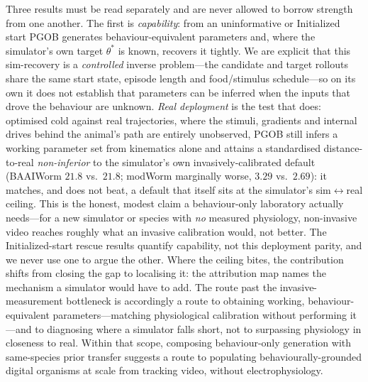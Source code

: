\documentclass[11pt]{article}
\begin{document}
Three results must be read separately and are never allowed to borrow strength from one another. The first is \emph{capability}: from an uninformative or Initialized start PGOB generates behaviour-equivalent parameters and, where the simulator's own target $\theta^{*}$ is known, recovers it tightly. We are explicit that this sim-recovery is a \emph{controlled} inverse problem---the candidate and target rollouts share the same start state, episode length and food/stimulus schedule---so on its own it does not establish that parameters can be inferred when the inputs that drove the behaviour are unknown. \emph{Real deployment} is the test that does: optimised cold against real trajectories, where the stimuli, gradients and internal drives behind the animal's path are entirely unobserved, PGOB still infers a working parameter set from kinematics alone and attains a standardised distance-to-real \emph{non-inferior} to the simulator's own invasively-calibrated default (BAAIWorm $21.8$ vs.\ $21.8$; modWorm marginally worse, $3.29$ vs.\ $2.69$): it matches, and does not beat, a default that itself sits at the simulator's sim$\leftrightarrow$real ceiling. This is the honest, modest claim a behaviour-only laboratory actually needs---for a new simulator or species with \emph{no} measured physiology, non-invasive video reaches roughly what an invasive calibration would, not better. The Initialized-start rescue results quantify capability, not this deployment parity, and we never use one to argue the other. Where the ceiling bites, the contribution shifts from closing the gap to localising it: the attribution map names the mechanism a simulator would have to add. The route past the invasive-measurement bottleneck is accordingly a route to obtaining working, behaviour-equivalent parameters---matching physiological calibration without performing it---and to diagnosing where a simulator falls short, not to surpassing physiology in closeness to real. Within that scope, composing behaviour-only generation with same-species prior transfer suggests a route to populating behaviourally-grounded digital organisms at scale from tracking video, without electrophysiology.
\end{document}
